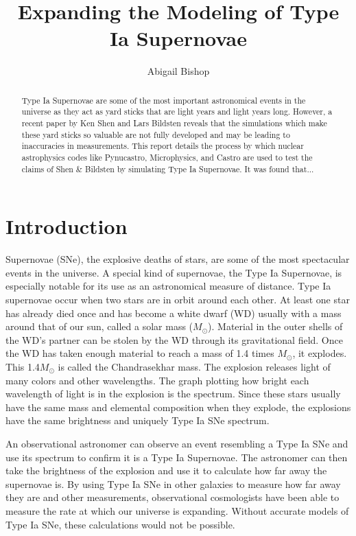\documentclass[11pt, oneside]{article}   	%
\title{Expanding the Modeling of Type Ia Supernovae}
\author{Abigail Bishop}
\begin{document}
\maketitle

\begin{abstract}

  Type Ia Supernovae are some of the most important astronomical events in the universe as they act as yard sticks that are light years and light years long. However, a recent paper by Ken Shen and Lars Bildsten reveals that the simulations which make these yard sticks so valuable are not fully developed and may be leading to inaccuracies in measurements. This report details the process by which nuclear astrophysics codes like Pynucastro, Microphysics, and Castro are used to test the claims of Shen \& Bildsten by simulating Type Ia Supernovae. It was found that... %
  
  
\end{abstract}


\section{Introduction}
  
  Supernovae (SNe), the explosive deaths of stars, are some of the most spectacular events in the universe. A special kind of supernovae, the Type Ia Supernovae, is especially notable for its use as an astronomical measure of distance. Type Ia supernovae occur when two stars are in orbit around each other. At least one star has already died once and has become a white dwarf (WD) usually with a mass around that of our sun, called a solar mass ($M_{\odot}$). Material in the outer shells of the WD's partner can be stolen by the WD through its gravitational field. Once the WD has taken enough material to reach a mass of 1.4 times $M_{\odot}$, it explodes. This 1.4$M_{\odot}$ is called the Chandrasekhar mass. The explosion releases light of many colors and other wavelengths. The graph plotting how bright each wavelength of light is in the explosion is the spectrum. Since these stars usually have the same mass and elemental composition when they explode, the explosions have the same brightness and uniquely Type Ia SNe spectrum. 
  
  An observational astronomer can observe an event resembling a Type Ia SNe and use its spectrum to confirm it is a Type Ia Supernovae. The astronomer can then take the brightness of the explosion and use it to calculate how far away the supernovae is. By using Type Ia SNe in other galaxies to measure how far away they are and other measurements, observational cosmologists have been able to measure the rate at which our universe is expanding. Without accurate models of Type Ia SNe, these calculations would not be possible. 
  
\end{document}
